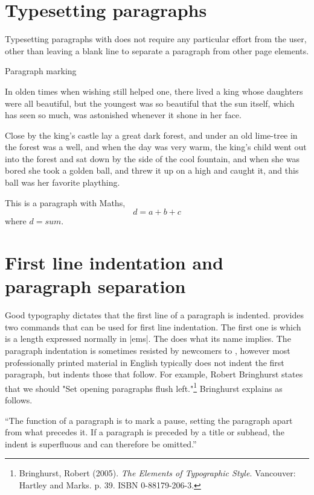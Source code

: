 \section{Typesetting paragraphs}

Typesetting paragraphs with \tex does not require any particular effort from the user, other than leaving a blank line to separate a paragraph from other page elements.

\begin{texexample}{Paragraph marking}{} 

In olden times when wishing
still helped one, there lived a
king whose daughters were all
beautiful, but the youngest was so
beautiful that the sun itself,
which has seen so much, was
astonished whenever it shone in
her face. 

Close by the king's
castle lay a great dark forest,
and under an old lime-tree in the
forest was a well, and when
the day was very warm, the
king's child went out into the 
forest and sat down by the side
of the cool fountain, and when she was bored she
took a golden ball, and threw it up on a high and caught it, and this
ball was her favorite plaything.

 This is a paragraph with Maths,
 \[d=a+b+c\]
 where $d=sum$.
\end{texexample}



\section{First line indentation and paragraph separation}

Good typography dictates that the first line of a paragraph is indented. \tex provides two commands that can be used for first line indentation. The first one is  which is a length expressed normally in |ems|. The  does what its name implies. The paragraph indentation is sometimes resisted by newcomers to \tex, however most professionally printed material in English typically does not indent the first paragraph, but indents those that follow. For example, Robert Bringhurst states that we should "Set opening paragraphs flush left."\footnote{Bringhurst, Robert (2005). \textit{The Elements of Typographic Style}. Vancouver: Hartley and Marks. p. 39. ISBN 0-88179-206-3.} Bringhurst explains as follows.

\enquote{The function of a paragraph is to mark a pause, setting the paragraph apart from what precedes it. If a paragraph is preceded by a title or subhead, the indent is superfluous and can therefore be omitted.}

